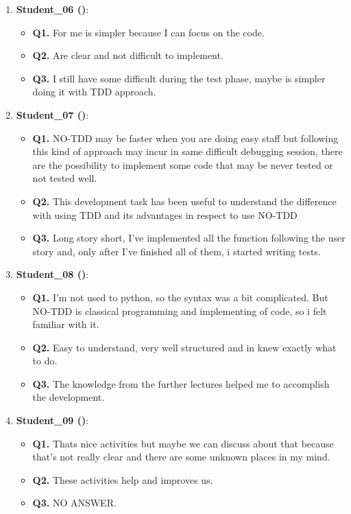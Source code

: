 \begin{enumerate}
    \item \textbf{Student\_06 (\notdd)}: 
    \begin{itemize}
        \item \textbf{Q1.} For me is simpler because I can focus on the code.
        \item \textbf{Q2.} Are clear and not difficult to implement.
        \item \textbf{Q3.}  I still have some difficult during the test phase, maybe is simpler doing it with TDD approach.
    \end{itemize}

    \item \textbf{Student\_07 (\notdd)}: 
    \begin{itemize}
        \item \textbf{Q1.} NO-TDD may be faster when you are doing easy staff but following this kind of approach may incur in same difficult debugging session, there are the possibility to implement some code that may be never tested or not tested well.
        \item \textbf{Q2.} This development task has been useful to understand the difference with using TDD and its advantages in respect to use NO-TDD 
        \item \textbf{Q3.} Long story short, I've implemented all the function following the user story and, only after I've finished all of them, i started writing tests.
    \end{itemize}

    \item \textbf{Student\_08 (\notdd)}: 
    \begin{itemize}
        \item \textbf{Q1.} I’m not used to python, so the syntax was a bit complicated. But NO-TDD is classical programming and implementing of code, so i felt familiar with it.
        \item \textbf{Q2.} Easy to understand, very well structured and in knew exactly what to do.
        \item \textbf{Q3.} The knowledge from the further lectures helped me to accomplish the development.
    \end{itemize}

    \item \textbf{Student\_09 (\notdd)}: 
    \begin{itemize}
        \item \textbf{Q1.} Thats nice activities but maybe we can discuss about that because that’s not really clear and there are some unknown places in my mind.
        \item \textbf{Q2.} These activities help and improves us.
        \item \textbf{Q3.} NO ANSWER.
    \end{itemize}
\end{enumerate}


